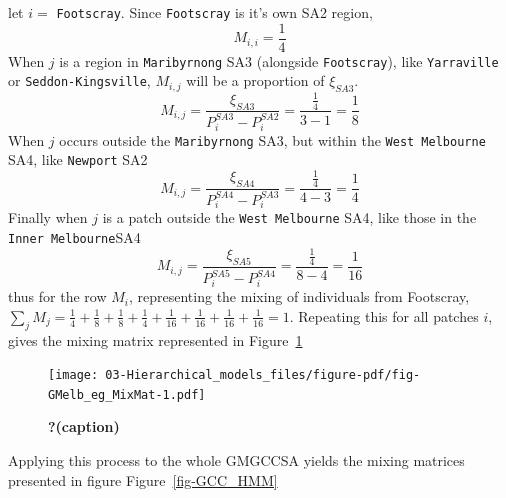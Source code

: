 \documentclass[
  letterpaper,
  DIV=11,
  numbers=noendperiod]{scrreprt}
\begin{document}
let \(i =\) \texttt{Footscray}. Since \texttt{Footscray} is it's own SA2
region, \[M_{i,i} = \frac{1}{4}\] When \(j\) is a region in
\texttt{Maribyrnong} SA3 (alongside \texttt{Footscray}), like
\texttt{Yarraville} or \texttt{Seddon-Kingsville}, \(M_{i,j}\) will be a
proportion of \(\xi_{SA3}\). \[
M_{i,j} = \frac{\xi_{SA3}}{P_{i}^{SA3} - P_{i}^{SA2}} = \frac{\frac{1}{4}}{3 - 1} = \frac{1}{8}
\] When \(j\) occurs outside the \texttt{Maribyrnong} SA3, but within
the \texttt{West\ Melbourne} SA4, like \texttt{Newport} SA2 \[
M_{i,j} = \frac{\xi_{SA4}}{P_{i}^{SA4} - P_{i}^{SA3}} = \frac{\frac{1}{4}}{4 - 3} = \frac{1}{4}
\] Finally when \(j\) is a patch outside the \texttt{West\ Melbourne}
SA4, like those in the \texttt{Inner\ Melbourne}SA4 \[
M_{i,j} = \frac{\xi_{SA5}}{P_{i}^{SA5} - P_{i}^{SA4}} = \frac{\frac{1}{4}}{8 - 4} = \frac{1}{16}
\] thus for the row \(M_{i}\), representing the mixing of individuals
from Footscray,
\(\sum\limits_{j}M_{j}= \frac{1}{4} +\frac{1}{8} + \frac{1}{8} + \frac{1}{4} + \frac{1}{16} + \frac{1}{16} + \frac{1}{16} + \frac{1}{16} = 1\).
Repeating this for all patches \(i\), gives the mixing matrix
represented in Figure~\ref{fig-GMelb_eg_MixMat}

\begin{figure}

{\centering \texttt{[image: 03-Hierarchical\_models\_files/figure-pdf/fig-GMelb\_eg\_MixMat-1.pdf]}

}

\caption{\label{fig-GMelb_eg_MixMat}\textbf{?(caption)}}

\end{figure}

Applying this process to the whole GMGCCSA yields the mixing matrices
presented in figure Figure~\ref{fig-GCC_HMM}
\end{document}
